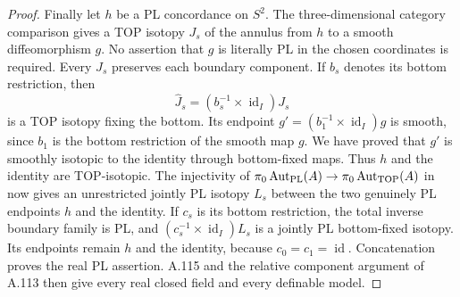 \begin{proof}
Finally let $h$ be a PL concordance on $S^2$. The
three-dimensional category comparison
\cite[Chapter~I, Section~1, Corollary~3 and conclusion,
pp.~7--9]{Laudenbach1974} gives a TOP isotopy $J_s$ of the annulus
from $h$ to a smooth diffeomorphism $g$. No assertion that $g$ is
literally PL in the chosen coordinates is required. Every $J_s$
preserves each boundary component. If $b_s$ denotes its bottom
restriction, then
\[
 \widehat J_s=(b_s^{-1}\times\operatorname{id}_I)J_s
\]
is a TOP isotopy fixing the bottom. Its endpoint
$g'=(b_1^{-1}\times\operatorname{id}_I)g$ is smooth, since $b_1$
is the bottom restriction of the smooth map $g$.
We have proved that $g'$ is smoothly isotopic to the identity
through bottom-fixed maps. Thus $h$ and the identity are
TOP-isotopic. The injectivity of
$\pi_0\operatorname{Aut}_{\rm PL}(A)\to
 \pi_0\operatorname{Aut}_{\rm TOP}(A)$ in
\cite[Chapter~I, Section~1, pp.~7--8]{Laudenbach1974}
now gives an unrestricted jointly PL isotopy $L_s$ between the
two genuinely PL endpoints $h$ and the identity.
If $c_s$ is its bottom restriction, the total inverse boundary
family is PL, and
$(c_s^{-1}\times\operatorname{id}_I)L_s$ is a jointly PL
bottom-fixed isotopy. Its endpoints remain $h$ and the identity,
because $c_0=c_1=\operatorname{id}$. Concatenation proves the real
PL assertion. A.115 and the relative component argument of A.113
then give every real closed field and every definable model.
\end{proof}
